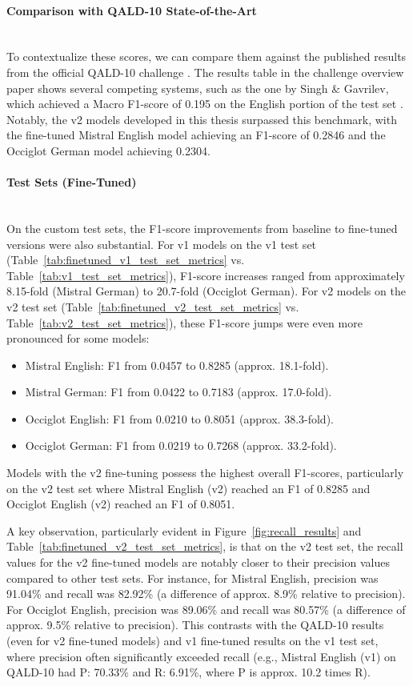 \paragraph{Comparison with QALD-10 State-of-the-Art} \mbox{}\\
To contextualize these scores, we can compare them against the published results from the official QALD-10 challenge \cite{usbeck2024qald}. 
The results table in the challenge overview paper shows several competing systems, such as the one by Singh \& Gavrilev, which achieved a Macro F1-score of 0.195 on the English portion of the test set \cite[Table 2]{usbeck2024qald}.
Notably, the v2 models developed in this thesis surpassed this benchmark, with the fine-tuned Mistral English model achieving an F1-score of 0.2846 and the Occiglot German model achieving 0.2304. 

\paragraph{Test Sets (Fine-Tuned)} \mbox{}\\
On the custom test sets, the F1-score improvements from baseline to fine-tuned versions were also substantial. 
For v1 models on the v1 test set (Table~\ref{tab:finetuned_v1_test_set_metrics} vs. Table~\ref{tab:v1_test_set_metrics}), F1-score increases ranged from approximately 8.15-fold (Mistral German) to 20.7-fold (Occiglot German).
For v2 models on the v2 test set (Table~\ref{tab:finetuned_v2_test_set_metrics} vs. Table~\ref{tab:v2_test_set_metrics}), these F1-score jumps were even more pronounced for some models:
\begin{itemize}
    \item Mistral English: F1 from 0.0457 to 0.8285 (approx. 18.1-fold).
    \item Mistral German: F1 from 0.0422 to 0.7183 (approx. 17.0-fold).
    \item Occiglot English: F1 from 0.0210 to 0.8051 (approx. 38.3-fold).
    \item Occiglot German: F1 from 0.0219 to 0.7268 (approx. 33.2-fold).
\end{itemize}
Models with the v2 fine-tuning possess the highest overall F1-scores, particularly on the v2 test set where Mistral English (v2) reached an F1 of 0.8285 and Occiglot English (v2) reached an F1 of 0.8051.

A key observation, particularly evident in Figure~\ref{fig:recall_results} and Table~\ref{tab:finetuned_v2_test_set_metrics}, is that on the v2 test set, the recall values for the v2 fine-tuned models are notably closer to their precision values compared to other test sets. 
For instance, for Mistral English, precision was 91.04\% and recall was 82.92\% (a difference of approx. 8.9\% relative to precision). 
For Occiglot English, precision was 89.06\% and recall was 80.57\% (a difference of approx. 9.5\% relative to precision). 
This contrasts with the QALD-10 results (even for v2 fine-tuned models) and v1 fine-tuned results on the v1 test set, where precision often significantly exceeded recall (e.g., Mistral English (v1) on QALD-10 had P: 70.33\% and R: 6.91\%, where P is approx. 10.2 times R).